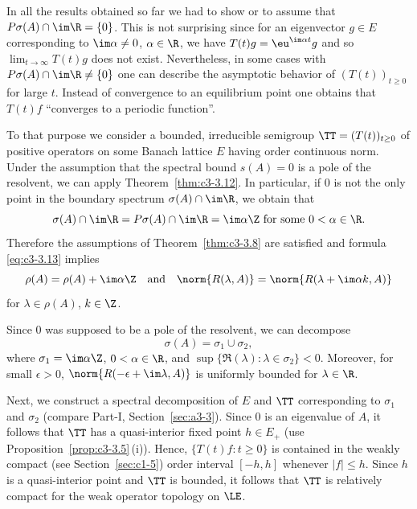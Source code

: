 In all the results obtained so far we had to show or to assume that $P{\sigma}(A) \cap \im\R = \{0\}$.
This is not surprising since for an eigenvector $g \in E$ corresponding to $\im\alpha \neq 0$, $\alpha \in \R$, we have $T(t)g = \eu^{\im\alpha t}g$ and so $\lim_{t\to\infty} T(t)g$ does not exist.
Nevertheless, in some cases with $P{\sigma}(A)\cap \im\R \neq \{0\}$ one can describe the asymptotic behavior of\/ $(T(t))_{t \geq 0}$ for large $t$.
Instead of convergence to an equilibrium point one obtains that $T(t)f$  \enquote{converges to a periodic function}.

To that purpose we consider a bounded, irreducible semigroup $\TT = (T(t))_{t \geq 0}$ of positive operators on some Banach lattice $E$ having order continuous norm.
Under the assumption that the spectral bound $s(A) = 0$ is a pole of the resolvent, we can apply Theorem~\ref{thm:c3-3.12}.
In particular, if\/ $0$ is not the only point in the boundary spectrum $\sigma(A)\cap \im\R$, we obtain that
\begin{equation*}\label{eq:c4-2.9-kgk}
\sigma(A)\cap \im\R = P{\sigma}(A)\cap \im\R = \im\alpha\Z \text{ for some } 0 < \alpha \in \R.
\end{equation*}
Therefore the assumptions of Theorem~\ref{thm:c3-3.8} are satisfied and formula \eqref{eq:c3-3.13} implies
\begin{equation}\label{eq:c4-2.10}
\rho(A) = \rho(A) + \im\alpha\Z \quad \text{and} \quad \norm{R(\lambda,A)} = \norm{R(\lambda+\im\alpha k,A)}
\end{equation}
for $\lambda \in \rho(A)$, $k \in \Z$.

Since $0$ was supposed to be a pole of the resolvent, we can decompose
\begin{equation*}\label{eq:c4-2.10-kgk}
\sigma(A) = \sigma_{1} \cup \sigma_{2},
\end{equation*}
where $\sigma_{1} = \im\alpha\Z$, $0 < \alpha \in \R$, and $\sup\{\Re(\lambda) \colon \lambda \in \sigma_{2}\} < 0$.
Moreover, for small $\epsilon > 0$, $\norm{R(-\epsilon+\im\lambda,A)}$ is uniformly bounded for $\lambda \in \R$.

Next, we construct a spectral decomposition of\/ $E$ and $\TT$ corresponding to $\sigma_{1}$ and $\sigma_{2}$ (compare Part-I, Section~\ref{sec:a3-3}).
Since $0$ is an eigenvalue of\/ $A$, it follows that $\TT$ has a quasi-interior fixed point $h \in E_{+}$ (use Proposition~\ref{prop:c3-3.5}\,(i)).
Hence, $\{T(t)f \colon t \geq 0\}$ is contained in the weakly compact (see Section~\ref{sec:c1-5}) order interval $[-h,h]$ whenever $|f| \leq h$.
Since $h$ is a quasi-interior point and $\TT$ is bounded, it follows that $\TT$ is relatively compact for the weak operator topology on $\LE$.


